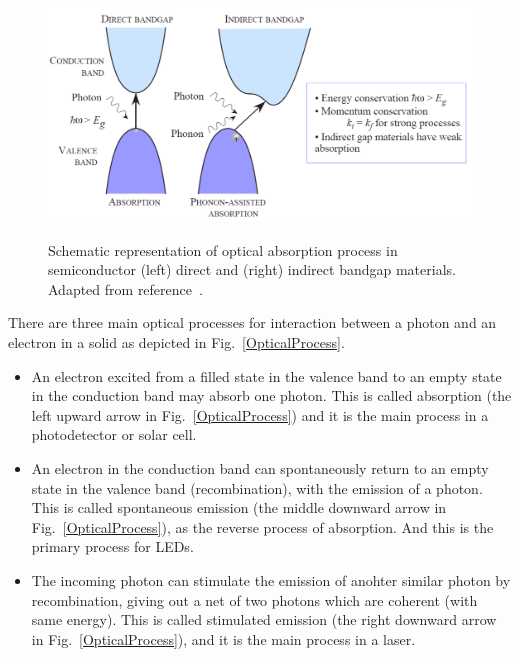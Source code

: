 \begin{figure}
  \caption[Schematic respresentation of optical absorption process in semiconductor (left) direct and (right) indirect bandgap materials.]{Schematic representation of optical absorption process in semiconductor (left) direct and (right) indirect bandgap materials. Adapted from reference~\cite{singh2007semiconductor}.}
  \centering
  \includegraphics[width=\textwidth]{pictures/RM/DirectTransition}
  \label{DirectTransition}
\end{figure}

There are three main optical processes for interaction between a photon and an electron in a solid as depicted in Fig.~\ref{OpticalProcess}.
\begin{itemize}
  \item An electron excited from a filled state in the valence band to an empty state in the conduction band may absorb one photon. This is called absorption (the left upward arrow in Fig.~\ref{OpticalProcess}) and it is the main process in a photodetector or solar cell.
  \item An electron in the conduction band can spontaneously return to an empty state in the valence band (recombination), with the emission of a photon.  This is called spontaneous emission (the middle downward arrow in Fig.~\ref{OpticalProcess}), as the reverse process of absorption. And this is the primary process for LEDs.
  \item The incoming photon can stimulate the emission of anohter similar photon by recombination, giving out a net of two photons which are coherent (with same energy). This is called stimulated emission (the right downward arrow in Fig.~\ref{OpticalProcess}), and it is the main process in a laser.
\end{itemize}

